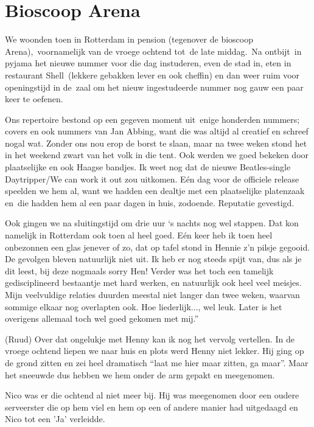 \documentclass[10pt,twoside,openright]{memoir}
\begin{document}
\chapter{Bioscoop Arena} %
\label{cha:arena}

We woonden toen in Rotterdam in pension (tegenover de bioscoop Arena), voornamelijk van de vroege ochtend tot de late middag. Na ontbijt in pyjama het nieuwe nummer voor die dag instuderen, even de stad in, eten in restaurant Shell (lekkere gebakken lever en ook cheffin) en dan weer ruim voor openingstijd in de zaal om het nieuw ingestudeerde nummer nog gauw een paar keer te oefenen. 

Ons repertoire bestond op een gegeven moment uit enige honderden nummers; covers en ook nummers van Jan Abbing, want die was altijd al creatief en schreef nogal wat. Zonder ons nou erop de borst te slaan, maar na twee weken stond het in het weekend zwart van het volk in die tent. Ook werden we goed bekeken door plaatselijke en ook Haagse bandjes. Ik weet nog dat de nieuwe Beatles-single Daytripper/We can work it out zou uitkomen. Eén dag voor de officiele release speelden we hem al, want we hadden een dealtje met een plaatselijke platenzaak en die hadden hem al een paar dagen in huis, zodoende. Reputatie gevestigd. 

Ook gingen we na sluitingstijd om drie uur `s nachts nog wel stappen. Dat kon namelijk in Rotterdam ook toen al heel goed. Eén keer heb ik toen heel onbezonnen een glas jenever of zo, dat op tafel stond in Hennie z'n pilsje gegooid. De gevolgen bleven natuurlijk niet uit. Ik heb er nog steeds spijt van, dus als je dit leest, bij deze nogmaals sorry Hen! Verder was het toch een tamelijk gedisciplineerd bestaantje met hard werken, en natuurlijk ook heel veel meisjes. Mijn veelvuldige relaties duurden meestal niet langer dan twee weken, waarvan sommige elkaar nog overlapten ook. Hoe liederlijk..., wel leuk. Later is het overigens allemaal toch wel goed gekomen met mij.”

(Ruud) Over dat ongelukje met Henny kan ik nog het vervolg vertellen. In de vroege ochtend liepen we naar huis en plots werd Henny niet lekker. Hij ging op de grond zitten en zei heel dramatisch “laat me hier maar zitten, ga maar”. Maar het sneeuwde dus hebben we hem onder de arm gepakt en meegenomen. 

Nico was er die ochtend al niet meer bij. Hij was meegenomen door een oudere serveerster die op hem viel en hem op een of andere manier had uitgedaagd en Nico tot een ’Ja’ verleidde.
\end{document}
